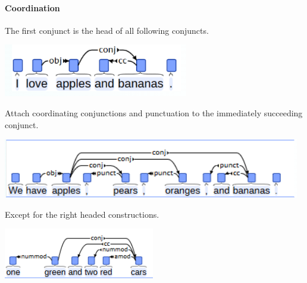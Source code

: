 \documentclass[10pt]{report}
\begin{document}
\paragraph{Coordination} The first conjunct is the head of all following conjuncts.
\begin{center}
	\includegraphics[scale=0.6]{51.png}
\end{center}
Attach coordinating conjunctions and punctuation to the immediately succeeding conjunct.
\begin{center}
	\includegraphics[scale=0.5]{52.png}
\end{center}
Except for the right headed constructions.
\begin{center}
	\includegraphics[scale=0.75]{53.png}
\end{center}
\end{document}
